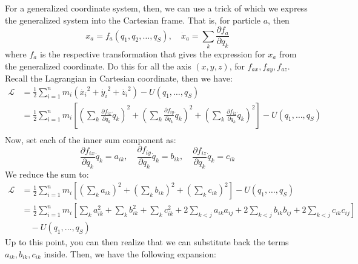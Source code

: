 For a generalized coordinate system, then, we can use a trick of which we express the generalized system into the Cartesian frame. That is, for particle $a$, then
\begin{equation}
  x_{a} = f_{a} (q_1 , q_2 , \dots, q_{S}), \quad \dot{x}_{a} = \sum_{k} \frac{\partial f_{a}}{\partial q_k}
\end{equation}
where $f_{a}$ is the respective transformation that gives the expression for $x_{a}$ from the generalized coordinate. Do this for all the axis $(x,y,z)$, for $f_{ax}, f_{ay}, f_{az}$. Recall the Lagrangian in Cartesian coordinate, then we have: 
\begin{equation}
    \begin{split}
  \mathcal{L} & = \frac{1}{2} \sum^{n}_{i=1} m_{i} (\dot{x_{i}}^{2}+ \dot{y_{i}}^{2} + \dot{z_{i}}^{2}) - U(q_{1},\dots,q_{S})\\ 
  & = \frac{1}{2}  \sum_{i=1}^{n} m_{i} \left[  \left(\sum_{k}\frac{\partial f_{ix}}{\partial q_{k}} \dot{q}_{k}\right)^{2} + \left(\sum_{k}\frac{\partial f_{iy}}{\partial q_{k}} \dot{q}_{k}\right)^{2} + \left(\sum_{k}\frac{\partial f_{iz}}{\partial q_{k}} \dot{q}_{k} \right)^{2} \right] - U(q_{1},\dots,q_{S})\\
\end{split}
\end{equation}
Now, set each of the inner sum component as: 
$$
\frac{\partial f_{ix}}{\partial q_{k}} \dot{q}_{k} = a_{ik}, \quad \frac{\partial f_{iy}}{\partial q_{k}}\dot{q}_{k}  = b_{ik} ,\quad \frac{\partial f_{iz}}{\partial q_{k}}\dot{q}_{k}  = c_{ik}
$$
We reduce the sum to: 
\begin{align}
\mathcal{L} &= \frac{1}{2} \sum_{i=1}^{n} m_{i} \left[ 
\left( \sum_{k} a_{ik} \right)^{2} + 
\left( \sum_{k} b_{ik} \right)^{2} + 
\left( \sum_{k} c_{ik} \right)^{2} 
\right] - U(q_{1},\dots,q_{S}) \nonumber \\
&= \frac{1}{2} \sum_{i=1}^{n} m_{i} \left[
\sum_{k} a_{ik}^{2} + 
\sum_{k} b_{ik}^{2} + 
\sum_{k} c_{ik}^{2} + 
2\sum_{k<j} a_{ik} a_{ij} + 
2\sum_{k<j} b_{ik} b_{ij} + 
2\sum_{k<j} c_{ik} c_{ij} 
\right] \nonumber \\
&\quad - U(q_{1},\dots,q_{S})
\end{align}
Up to this point, you can then realize that we can substitute back the terms $a_{ik},b_{ik},c_{ik}$ inside. Then, we have the following expansion: 
